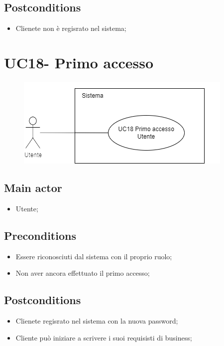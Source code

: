 \documentclass{article}
\begin{document}
    \subsection*{Postconditions}
        \begin{itemize}
            \item Clienete non è regisrato nel sistema;
        \end{itemize}
\section{UC18- Primo accesso}
 \begin{figure}[h]
          \centering
          \includegraphics{./imgUML/UC18.png}
          \label{fig:immagine}
        \end{figure}
\subsection*{Main actor}
        \begin{itemize}
            \item Utente;
        \end{itemize}
        
    \subsection*{Preconditions}
        \begin{itemize}
            \item Essere riconosciuti dal sistema con il proprio ruolo;
            \item Non aver ancora effettuato il primo accesso;
        \end{itemize}
        
    \subsection*{Postconditions}
        \begin{itemize}
            \item Clienete regisrato nel sistema con la nuova password;
            \item Cliente può iniziare a scrivere i suoi requisisti di business;
        \end{itemize}
\end{document}
